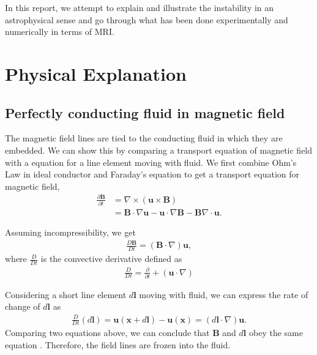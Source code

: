 \documentclass{jfm}
\newcommand{\del}{\nabla}
\begin{document}
In this report, we attempt to explain and illustrate the instability in an 
astrophysical sense and go through what has been done experimentally and 
numerically in terms of MRI.



\section{Physical Explanation}


%
%
\subsection{Perfectly conducting fluid in magnetic field}

The magnetic field lines are tied to the conducting fluid in which they are 
embedded. We can show this by comparing a transport equation of magnetic field
with a equation for a line element moving with fluid. We first combine Ohm's 
Law in ideal conductor and Faraday's equation to get a transport equation for 
magnetic field,
\begin{align}
    \frac{\partial \mathbf{B}}{\partial t} &= \del \times (\mathbf{u}\times \mathbf{B}) \nonumber \\
    &=\mathbf{B}\cdot\del \mathbf{u} - {\mathbf{u}\cdot\del}\mathbf{B} -\mathbf{B}\del\cdot\mathbf{u}.
\end{align}

Assuming incompressibility, we get
\begin{align}
    \frac{D \mathbf{B}}{D t} = (\mathbf{B}\cdot \del) \mathbf{u},
\end{align}
where $\frac{D}{Dt}$ is the convective derivative defined as
\begin{align}
    \frac{D}{Dt} = \frac{\partial}{\partial t} + (\mathbf{u} \cdot \del)
\end{align}

Considering a short line element $d\mathbf{l}$ moving with fluid, we can express 
the rate of change of $d\mathbf{l}$ as
\begin{align}
    \frac{D}{Dt}\left(d\mathbf{l}\right) = \mathbf{u}(\mathbf{x}+d\mathbf{l})-\mathbf{u}(\mathbf{x})=(d\mathbf{l}\cdot\del)\mathbf{u}.
\end{align}
Comparing two equations above, we can conclude that $\mathbf{B}$ and 
$d\mathbf{l}$ obey the same equation \cite[see][]{Davidson2001}. Therefore, the 
field lines are frozen into the fluid.
\end{document}
